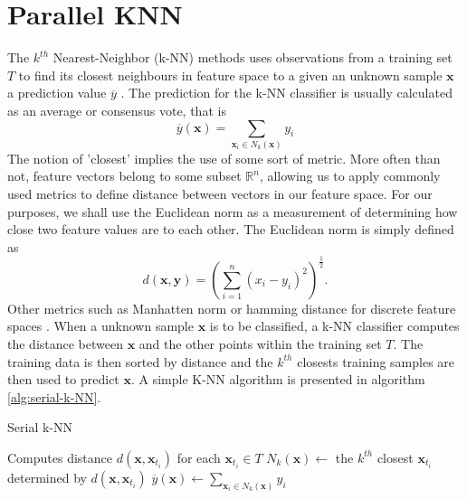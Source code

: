 \section{Parallel KNN}
The $k^{th}$ Nearest-Neighbor (k-NN) methods uses observations from a training set $T$ to find its closest neighbours in feature space to a given an unknown sample $\bm{x}$ a prediction value $\overline{y}$ \cite{HastieTrevor2009EoSL}. The prediction for the k-NN classifier is usually calculated as an average or consensus vote, that is
\[
    \overline{y} \left( \bm{x} \right) = \sum_{\bm{x}_{i} \in N_{k} (\bm{x})} y_{i}
\]
The notion of 'closest' implies the use of some sort of metric. More often than not, feature vectors belong to some subset $\mathbb{R}^{n}$, allowing us to apply commonly used metrics to define distance between vectors in our feature space. For our purposes, we shall use the Euclidean norm as a measurement of determining how close two feature values are to each other. The Euclidean norm is simply defined as
\[
    d \left( \bm{x}, \bm{y} \right) = \left( \sum_{i=1}^{n} \left( x_{i} - y_{i} \right)^{2} \right)^{\frac{1}{2}}.
\]
Other metrics such as Manhatten norm or hamming distance for discrete feature spaces \cite{HastieTrevor2009EoSL}. When a unknown sample $\bm{x}$ is to be classified, a k-NN classifier computes the distance between $\bm{x}$ and the other points within the training set $T$. The training data is then sorted by distance and the $k^{th}$ closests training samples are then used to predict $\bm{x}$. A simple K-NN algorithm is presented in algorithm \ref{alg:serial-k-NN}.
\begin{algorithm}[ht!!!]
\caption{Serial k-NN}
\label{alg:serial-k-NN}
\SetAlgoLined
    
    \BlankLine
    Computes distance $d \left( \bm{x}, \bm{x}_{t_i} \right)$ for each $\bm{x}_{t_i} \in T$\;
    $N_{k} (\bm{x}) \gets$ the $k^{th}$ closest $\bm{x}_{t_i}$ determined by $d \left( \bm{x}, \bm{x}_{t_i} \right)$\;
    $\overline{y} \left( \bm{x} \right) \gets \sum_{\bm{x}_{i} \in N_{k} (\bm{x})} y_{i}$\;
    \BlankLine
\end{algorithm}
